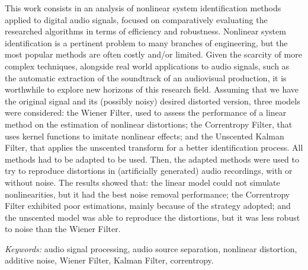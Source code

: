 \begin{foreignabstract}

This work consists in an analysis of nonlinear system identification methods applied to digital audio signals, focused on comparatively evaluating the researched algorithms in terms of efficiency and robustness. Nonlinear system identification is a pertinent problem to many branches of engineering, but the most popular methods are often costly and/or limited. Given the scarcity of more complex techniques, alongside real world applications to audio signals, such as the automatic extraction of the soundtrack of an audiovisual production, it is worthwhile to explore new horizons of this research field. Assuming that we have the original signal and its (possibly noisy) desired distorted version, three models were considered: the Wiener Filter, used to assess the performance of a linear method on the estimation of nonlinear distortions; the Correntropy Filter, that uses kernel functions to imitate nonlinear effects; and the Unscented Kalman Filter, that applies the unscented transform for a better identification process. All methods had to be adapted to be used. Then, the adapted methods were used to try to reproduce distortions in (artificially generated) audio recordings, with or without noise. The results showed that: the linear model could not simulate nonlinearities, but it had the best noise removal performance; the Correntropy Filter exhibited poor estimations, mainly because of the strategy adopted; and the unscented model was able to reproduce the distortions, but it was less robust to noise than the Wiener Filter.

\vspace*{7mm}
\noindent \textit{Keywords:} audio signal processing, audio source separation, nonlinear distortion, additive noise, Wiener Filter, Kalman Filter, correntropy.

\end{foreignabstract}